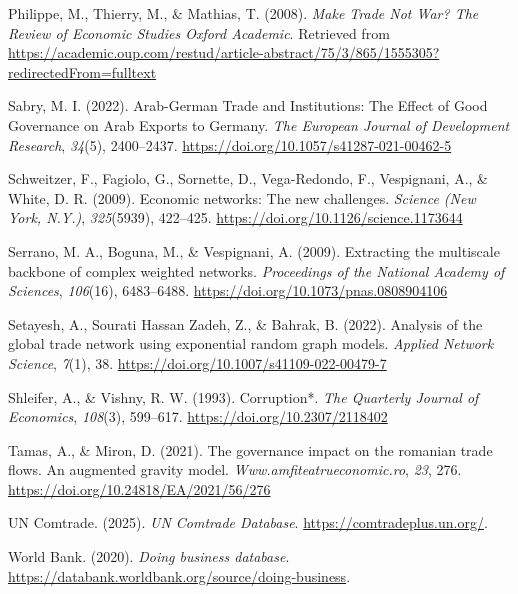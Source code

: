\documentclass[
]{article}
\newlength{\cslhangindent}
\newenvironment{CSLReferences}[2] %
 {\begin{list}{}{%
  \setlength{\itemindent}{0pt}
  \setlength{\leftmargin}{0pt}
  \setlength{\parsep}{0pt}
  \ifodd #1
   \setlength{\leftmargin}{\cslhangindent}
   \setlength{\itemindent}{-1\cslhangindent}
  \fi
  \setlength{\itemsep}{#2\baselineskip}}}
 {\end{list}}
\begin{document}
\begin{CSLReferences}{1}{0}
Philippe, M., Thierry, M., \& Mathias, T. (2008). \emph{Make {Trade}
{Not} {War}? {\textbar} {The} {Review} of {Economic} {Studies}
{\textbar} {Oxford} {Academic}}. Retrieved from
\url{https://academic.oup.com/restud/article-abstract/75/3/865/1555305?redirectedFrom=fulltext}

Sabry, M. I. (2022). Arab-{German} {Trade} and {Institutions}: {The}
{Effect} of {Good} {Governance} on {Arab} {Exports} to {Germany}.
\emph{The European Journal of Development Research}, \emph{34}(5),
2400--2437. \url{https://doi.org/10.1057/s41287-021-00462-5}

Schweitzer, F., Fagiolo, G., Sornette, D., Vega-Redondo, F., Vespignani,
A., \& White, D. R. (2009). Economic networks: The new challenges.
\emph{Science (New York, N.Y.)}, \emph{325}(5939), 422--425.
\url{https://doi.org/10.1126/science.1173644}

Serrano, M. A., Boguna, M., \& Vespignani, A. (2009). Extracting the
multiscale backbone of complex weighted networks. \emph{Proceedings of
the National Academy of Sciences}, \emph{106}(16), 6483--6488.
\url{https://doi.org/10.1073/pnas.0808904106}

Setayesh, A., Sourati Hassan Zadeh, Z., \& Bahrak, B. (2022). Analysis
of the global trade network using exponential random graph models.
\emph{Applied Network Science}, \emph{7}(1), 38.
\url{https://doi.org/10.1007/s41109-022-00479-7}

Shleifer, A., \& Vishny, R. W. (1993). Corruption*. \emph{The Quarterly
Journal of Economics}, \emph{108}(3), 599--617.
\url{https://doi.org/10.2307/2118402}

Tamas, A., \& Miron, D. (2021). The governance impact on the romanian
trade flows. An augmented gravity model.
\emph{Www.amfiteatrueconomic.ro}, \emph{23}, 276.
\url{https://doi.org/10.24818/EA/2021/56/276}

UN Comtrade. (2025). \emph{{UN Comtrade Database}}.
\url{https://comtradeplus.un.org/}.

World Bank. (2020). \emph{Doing business database}.
\url{https://databank.worldbank.org/source/doing-business}.


\end{CSLReferences}
\end{document}
